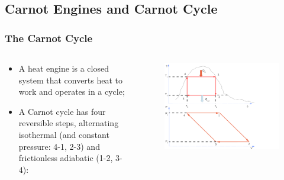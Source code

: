 \documentclass[10pt,compress]{beamer}
\begin{document}
\subsection{Carnot Engines and Carnot Cycle}

\begin{frame}
 \frametitle{The Carnot Cycle}
  \begin{columns}
   \begin{column}[c]{0.5\linewidth}
    \begin{itemize} 
     \item <1-> A heat engine is a closed system that converts heat to work and operates in a cycle;
     \item <2-> A Carnot cycle has four reversible steps, alternating isothermal (and constant pressure: 4-1, 2-3) and frictionless adiabatic (1-2, 3-4):
    \end{itemize} 

   \end{column}
   \begin{column}[c]{0.5\linewidth}
   \begin{figure}%
    \begin{center}
     \includegraphics[width=8.cm,clip]{./Pics/Carnot_PV_TS}
    \end{center}
   \end{figure}    

   \end{column}
  \end{columns}
 \normalsize
\end{frame}
\end{document}
